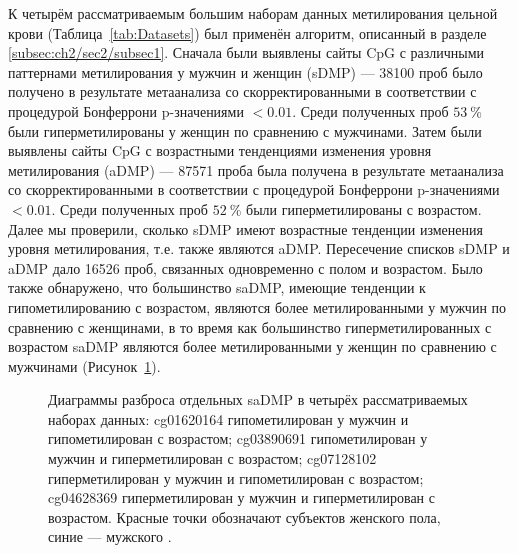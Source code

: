 К четырём рассматриваемым большим наборам данных метилирования цельной крови (Таблица~\ref{tab:Datasets}) был применён алгоритм, описанный в разделе \ref{subsec:ch2/sec2/subsec1}. Сначала были выявлены сайты CpG с различными паттернами метилирования у мужчин и женщин (sDMP) --- 38100 проб было получено в результате метаанализа со скорректированными в соответствии с процедурой Бонферрони p-значениями $< 0.01$. Среди полученных проб $53~\%$ были гиперметилированы у женщин по сравнению с мужчинами. Затем были выявлены сайты CpG с возрастными тенденциями изменения уровня метилирования (aDMP) --- 87571 проба была получена в результате метаанализа со скорректированными в соответствии с процедурой Бонферрони p-значениями $< 0.01$. Среди полученных проб $52~\%$ были гиперметилированы с возрастом. Далее мы проверили, сколько sDMP имеют возрастные тенденции изменения уровня метилирования, т.е. также являются aDMP. Пересечение списков sDMP и aDMP дало 16526 проб, связанных одновременно с полом и возрастом. Было также обнаружено, что большинство saDMP, имеющие тенденции к гипометилированию с возрастом, являются более метилированными у мужчин по сравнению с женщинами, в то время как большинство гиперметилированных с возрастом saDMP являются более метилированными у женщин по сравнению с мужчинами (Рисунок~\ref{fig:saDMP}).

\begin{figure}[ht]
	\caption[Диаграммы разброса отдельных saDMP в четырёх рассматриваемых наборах данных.]{Диаграммы разброса отдельных saDMP в четырёх рассматриваемых наборах данных: cg01620164 гипометилирован у мужчин и гипометилирован с возрастом; cg03890691 гипометилирован у мужчин и гиперметилирован с возрастом; cg07128102 гиперметилирован у мужчин и гипометилирован с возрастом; cg04628369 гиперметилирован у мужчин и гиперметилирован с возрастом. Красные точки обозначают субъектов женского пола, синие --- мужского \autocite{Yusipov2020}.}\label{fig:saDMP}
\end{figure}

